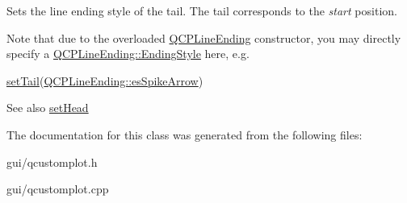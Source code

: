 Sets the line ending style of the tail. The tail corresponds to the {\itshape start} position.

Note that due to the overloaded \hyperlink{classQCPLineEnding}{Q\+C\+P\+Line\+Ending} constructor, you may directly specify a \hyperlink{classQCPLineEnding_a5ef16e6876b4b74959c7261d8d4c2cd5}{Q\+C\+P\+Line\+Ending\+::\+Ending\+Style} here, e.\+g.
\begin{DoxyCode}
\hyperlink{classQCPItemCurve_ac3488d8b1a6489c845dc5bff3ef71124}{setTail}(\hyperlink{classQCPLineEnding_a5ef16e6876b4b74959c7261d8d4c2cd5ab9964d0d03f812d1e79de15edbeb2cbf}{QCPLineEnding::esSpikeArrow}) 
\end{DoxyCode}


\begin{DoxySeeAlso}{See also}
\hyperlink{classQCPItemCurve_a08a30d9cdd63995deea3d9e20430676f}{set\+Head} 
\end{DoxySeeAlso}


The documentation for this class was generated from the following files\+:\begin{DoxyCompactItemize}
\item 
gui/qcustomplot.\+h\item 
gui/qcustomplot.\+cpp\end{DoxyCompactItemize}

